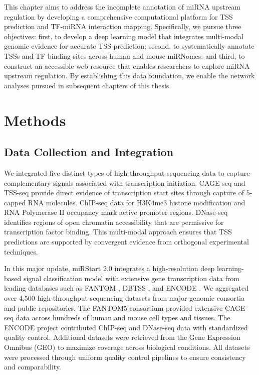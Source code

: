 This chapter aims to address the incomplete annotation of miRNA upstream regulation by developing a comprehensive computational platform for TSS prediction and TF-miRNA interaction mapping. Specifically, we pursue three objectives: first, to develop a deep learning model that integrates multi-modal genomic evidence for accurate TSS prediction; second, to systematically annotate TSSs and TF binding sites across human and mouse miRNomes; and third, to construct an accessible web resource that enables researchers to explore miRNA upstream regulation. By establishing this data foundation, we enable the network analyses pursued in subsequent chapters of this thesis.

\section{Methods}

\subsection{Data Collection and Integration}

We integrated five distinct types of high-throughput sequencing data to capture complementary signals associated with transcription initiation. CAGE-seq and TSS-seq provide direct evidence of transcription start sites through capture of 5\textquotesingle-capped RNA molecules. ChIP-seq data for H3K4me3 histone modification and RNA Polymerase II occupancy mark active promoter regions. DNase-seq identifies regions of open chromatin accessibility that are permissive for transcription factor binding. This multi-modal approach ensures that TSS predictions are supported by convergent evidence from orthogonal experimental techniques.

In this major update, miRStart 2.0 integrates a high-resolution deep learning-based signal classification model with extensive gene transcription data from leading databases such as FANTOM \cite{consorti2014promoter}, DBTSS \cite{suzuki2018dbtss}, and ENCODE \cite{luo2020developm}. We aggregated over 4,500 high-throughput sequencing datasets from major genomic consortia and public repositories. The FANTOM5 consortium provided extensive CAGE-seq data across hundreds of human and mouse cell types and tissues. The ENCODE project contributed ChIP-seq and DNase-seq data with standardized quality control. Additional datasets were retrieved from the Gene Expression Omnibus (GEO) to maximize coverage across biological conditions. All datasets were processed through uniform quality control pipelines to ensure consistency and comparability.

